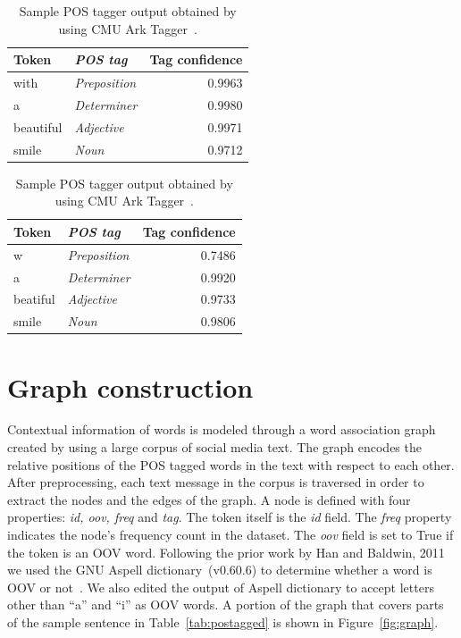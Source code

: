 \documentclass[a4paper,onesided,12pt]{report}
\begin{document}
\begin{table}[htbp]
\caption{Sample POS tagger output obtained by using CMU Ark Tagger~\cite{owoputi2013improved,Gimpel:2011:PTT:2002736.2002747}.}
\begin{minipage}{.5\linewidth}
\begin{tabular}[h]{|l|>{\itshape}l|r|}
 \hline
Token & POS tag & Tag confidence \\
 \hline
with & Preposition & 0.9963 \\
 \hline
a & Determiner & 0.9980 \\
 \hline
beautiful & Adjective & 0.9971 \\
 \hline
smile & Noun & 0.9712 \\
 \hline
\end{tabular}
\end{minipage}
\begin{minipage}{.5\linewidth}
\begin{tabular}[h]{|l|>{\itshape}l|r|}
 \hline
Token & POS tag & Tag confidence \\
 \hline
w & Preposition & 0.7486 \\
 \hline
a & Determiner & 0.9920 \\
 \hline
beatiful & Adjective & 0.9733 \\
 \hline
smile & Noun & 0.9806 \\
 \hline
\end{tabular}
\end{minipage}
\label{tab:postags}
\end{table}

\section{Graph construction}

Contextual information of words is modeled through a word association graph created by using a large corpus of social media text. The graph encodes the relative positions of the POS tagged words in the text with respect to each other. After preprocessing, each text message in the corpus is traversed in order to extract the nodes and the edges of the graph.
A node is defined with four properties: \textit{id, oov, freq} and \textit{tag}. The token itself is the \textit{id} field. The \textit{freq} property indicates the node's frequency count in the dataset. The \textit{oov} field is set to True if the token is an OOV word. Following the prior work by Han and Baldwin, 2011 we used the GNU Aspell dictionary~(v0.60.6) to determine whether a word is OOV or not~\cite{Han:2011:LNS:2002472.2002520}. We also edited the output of Aspell dictionary to accept letters other than ``a'' and ``i'' as OOV words. A portion of the graph that covers parts of the sample sentence in Table~\ref{tab:postagged} is shown in Figure~\ref{fig:graph}.
\end{document}
